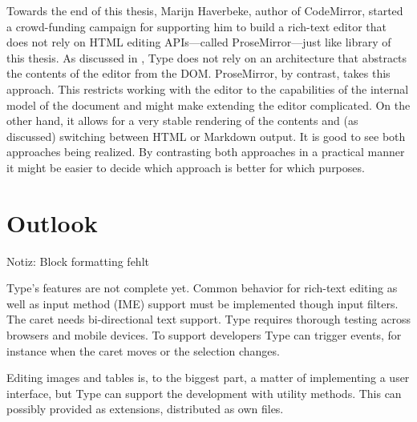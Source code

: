 Towards the end of this thesis, Marijn Haverbeke, author of CodeMirror, started a crowd-funding campaign for supporting him to build a rich-text editor that does not rely on HTML editing APIs---called ProseMirror---just like library of this thesis. As discussed in , Type does not rely on an architecture that abstracts the contents of the editor from the DOM. ProseMirror, by contrast, takes this approach. This restricts working with the editor to the capabilities of the internal model of the document and might make extending the editor complicated. On the other hand, it allows for a very stable rendering of the contents and (as discussed) switching between HTML or Markdown output. It is good to see both approaches being realized. By contrasting both approaches in a practical manner it might be easier to decide which approach is better for which purposes.


\section{Outlook}

Notiz: Block formatting fehlt

Type's features are not complete yet. Common behavior for rich-text editing as well as input method (IME) support must be implemented though input filters. The caret needs bi-directional text support. Type requires thorough testing across browsers and mobile devices. To support developers Type can trigger events, for instance when the caret moves or the selection changes.

Editing images and tables is, to the biggest part, a matter of implementing a user interface, but Type can support the development with utility methods. This can possibly provided as extensions, distributed as own files.





